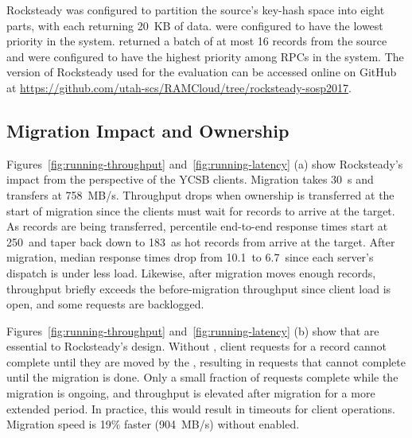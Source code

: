 Rocksteady was configured to partition the source's key-hash space into
eight parts, with each \pull returning 20~KB of data. \pulls were configured
to have the lowest priority in the system. \priopulls returned a batch
of at most 16 records from the
source and were configured
to have the highest priority among RPCs in the system. The version of Rocksteady
used for the evaluation can be accessed online on GitHub at\linebreak{}
{\url{https://github.com/utah-scs/RAMCloud/tree/rocksteady-sosp2017}}.

\subsection{Migration Impact and Ownership}
\label{sec:e2e}
Figures~\ref{fig:running-throughput} and~\ref{fig:running-latency} (a) show
Rocksteady's impact from the perspective of the YCSB clients. Migration
takes 30~s and transfers at 758~MB/s. Throughput drops when ownership is
transferred at the start of migration since the clients must wait for records
to arrive at the target. As records are being transferred, \nnnth percentile
end-to-end response times start at 250~\us and taper back down to 183~\us as
hot records from \priopulls arrive at the target. After migration, median
response times drop from 10.1~\us to 6.7~\us since each server's dispatch is under
less load. Likewise, after migration moves enough records, throughput briefly
exceeds the before-migration throughput since client load is open, and some
requests are backlogged.

Figures~\ref{fig:running-throughput} and~\ref{fig:running-latency} (b) show
that \priopulls are essential to Rocksteady's design. Without
\priopulls, client
requests for a record cannot complete until they are moved by the
\pulls, resulting in requests that cannot complete
until the migration is done. Only a small fraction of requests complete
while the migration is ongoing, and throughput is elevated after
migration for a more extended period. In practice, this would result in
timeouts for client operations. Migration speed is 19\% faster
(904~MB/s) without \priopulls enabled.

